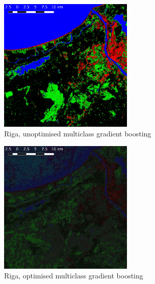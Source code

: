 \documentclass[a4paper,12pt]{scrbook}
\begin{document}
\begin{figure}
  \centering
  \begin{subfigure}[b]{0.48\textwidth}
    \centering
    \includegraphics[width=0.7\textwidth]{thesis-figures/figures-qgis/riga-gbu}
    \caption{Riga, unoptimised multiclass gradient boosting}
  \end{subfigure} \hfill
  \begin{subfigure}[b]{0.48\textwidth}
    \centering
    \includegraphics[width=0.7\textwidth]{thesis-figures/figures-qgis/riga-gbo}
    \caption{Riga, optimised multiclass gradient boosting}
  \end{subfigure}
  \begin{subfigure}[b]{0.48\textwidth}
    \centering

\end{subfigure}
\end{figure}
\end{document}
